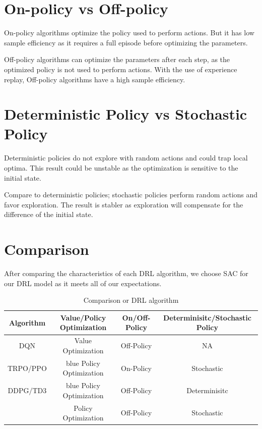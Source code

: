 \section{On-policy vs Off-policy}
On-policy algorithms optimize the policy used to perform actions. But it has low sample efficiency as it requires a full episode before optimizing the parameters. 
\par
Off-policy algorithms can optimize the parameters after each step, as the optimized policy is not used to perform actions.
With the use of experience replay, Off-policy algorithms have a high sample efficiency.
\section{Deterministic Policy vs Stochastic Policy}
Deterministic policies do not explore with random actions and could trap local optima. This result could be unstable as the optimization is sensitive to the initial state.
\par
Compare to deterministic policies; stochastic policies perform random actions and favor exploration. The result is stabler as exploration will compensate for the difference of the initial state.

\section{Comparison}
After comparing the characteristics of each DRL algorithm, we choose SAC for our DRL model as it meets all of our expectations.
\begin{table}[htb]
    \centering
    \begin{tabular}{||c||c|c|c||}
    \hline\hline
        Algorithm & Value/Policy Optimization & On/Off-Policy & Determinisitc/Stochastic Policy  \\ \hline
        DQN	& Value Optimization   & \color{blue} {Off-Policy} & NA \\ \hline
        TRPO/PPO &	{blue} {Policy Optimization} &	On-Policy &	\color{blue} {Stochastic} \\ \hline
        DDPG/TD3 &	{blue} {Policy Optimization} &	\color{blue} {Off-Policy}  &	Determinisitc \\ \hline
        \color{blue}{SAC}	& \color{blue} {Policy Optimization} &	\color{blue} {Off-Policy} & \color{blue} {Stochastic} \\ \hline
    \hline\hline
    \end{tabular}
    \caption{Comparison or DRL algorithm}
    \label{tab:my_label}
\end{table}


